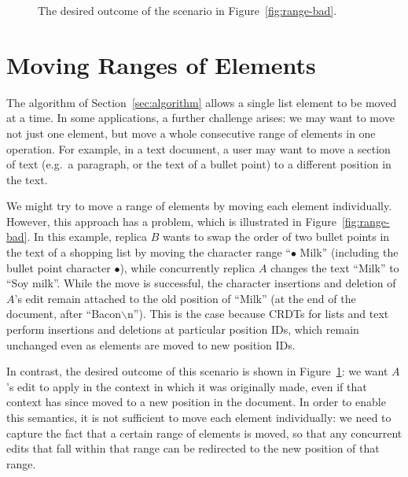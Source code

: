\documentclass[sigplan,10pt]{acmart}
\begin{document}
\begin{figure}
    \caption{The desired outcome of the scenario in Figure~\ref{fig:range-bad}.}
    \label{fig:range-good}
\end{figure}

\section{Moving Ranges of Elements}\label{sec:ranges}

The algorithm of Section~\ref{sec:algorithm} allows a single list element to be moved at a time.
In some applications, a further challenge arises: we may want to move not just one element, but move a whole consecutive range of elements in one operation.
For example, in a text document, a user may want to move a section of text (e.g.\ a paragraph, or the text of a bullet point) to a different position in the text.

We might try to move a range of elements by moving each element individually.
However, this approach has a problem, which is illustrated in Figure~\ref{fig:range-bad}.
In this example, replica $B$ wants to swap the order of two bullet points in the text of a shopping list by moving the character range ``$\bullet$ Milk'' (including the bullet point character $\bullet$), while concurrently replica $A$ changes the text ``Milk'' to ``Soy milk''.
While the move is successful, the character insertions and deletion of $A$'s edit remain attached to the old position of ``Milk'' (at the end of the document, after ``Bacon$\backslash$n'').
This is the case because CRDTs for lists and text perform insertions and deletions at particular position IDs, which remain unchanged even as elements are moved to new position IDs.

In contrast, the desired outcome of this scenario is shown in Figure~\ref{fig:range-good}: we want $A$'s edit to apply in the context in which it was originally made, even if that context has since moved to a new position in the document.
In order to enable this semantics, it is not sufficient to move each element individually: we need to capture the fact that a certain range of elements is moved, so that any concurrent edits that fall within that range can be redirected to the new position of that range.
\end{document}
